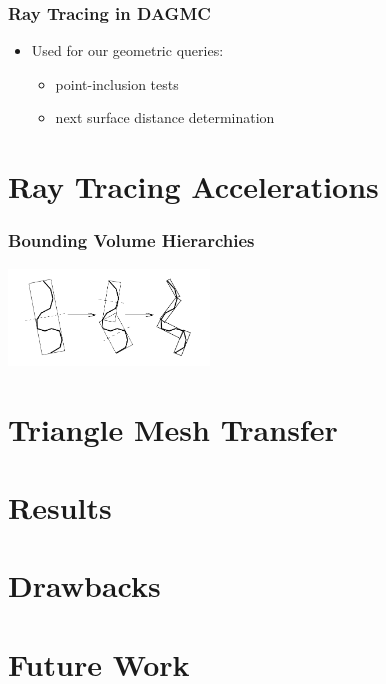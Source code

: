 \documentclass[12pt]{beamer}
\begin{document}
\begin{frame}

\frametitle{Ray Tracing in DAGMC}

\begin{itemize}
  \item Used for our geometric queries:
    \begin{itemize}
      \item point-inclusion tests
      \item next surface distance determination
    \end{itemize}
\end{itemize}


\end{frame}

\section{Ray Tracing Accelerations} %

\begin{frame}
\frametitle{Bounding Volume Hierarchies}

\includegraphics[width=0.4\textwidth]{./images/bvh_2d_ex.png}
\cite{gottschalk1996obbtree}

\end{frame}
\section{Triangle Mesh Transfer} %
\section{Results} %
\section{Drawbacks} %
\section{Future Work} %


\begin{frame}

\end{frame}

\end{document}
